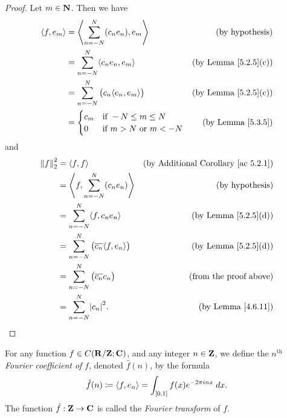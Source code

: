 \begin{proof}
    Let \(m \in \N\).
    Then we have
    \begin{align*}
        \inner*{f, e_m} & = \inner*{\sum_{n = -N}^N (c_n e_n), e_m}         & \text{(by hypothesis)}           \\
                        & = \sum_{n = -N}^N \inner*{c_n e_n, e_m}           & \text{(by Lemma \ref{5.2.5}(c))} \\
                        & = \sum_{n = -N}^N \big(c_n \inner*{e_n, e_m}\big) & \text{(by Lemma \ref{5.2.5}(c))} \\
                        & = \begin{cases}
                                c_m & \text{if } -N \leq m \leq N         \\
                                0   & \text{if } m > N \text{ or } m < -N
                            \end{cases}      & \text{(by Lemma \ref{5.3.5})}
    \end{align*}
    and
    \begin{align*}
        \norm*{f}_2^2 & = \inner*{f, f}                                            & \text{(by Additional Corollary \ref{ac 5.2.1})} \\
                      & = \inner*{f, \sum_{n = -N}^N (c_n e_n)}                    & \text{(by hypothesis)}                          \\
                      & = \sum_{n = -N}^N \inner*{f, c_n e_n}                      & \text{(by Lemma \ref{5.2.5}(d))}                \\
                      & = \sum_{n = -N}^N \big(\overline{c_n} \inner*{f, e_n}\big) & \text{(by Lemma \ref{5.2.5}(d))}                \\
                      & = \sum_{n = -N}^N \big(\overline{c_n} c_n\big)             & \text{(from the proof above)}                   \\
                      & = \sum_{n = -N}^N \abs{c_n}^2.                             & \text{(by Lemma \ref{4.6.11})}
    \end{align*}
\end{proof}

\begin{definition}\label{5.3.7}
    For any function \(f \in C(\R / \Z ; \C)\), and any integer \(n \in \Z\), we define the \(n^{\text{th}}\) \emph{Fourier coefficient of} \(f\), denoted \(\hat{f}(n)\), by the formula
    \[
        \hat{f}(n) \coloneqq \inner*{f, e_n} = \int_{[0, 1]} f(x) e^{- 2 \pi i n x} \; dx.
    \]
    The function \(\hat{f} : \Z \to \C\) is called the \emph{Fourier transform} of \(f\).
\end{definition}

